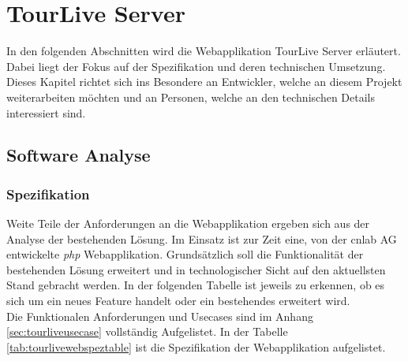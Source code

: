 \chapter{TourLive Server}
\label{sec:tourliveserver}
In den folgenden Abschnitten wird die Webapplikation TourLive Server erläutert. Dabei liegt der Fokus auf der Spezifikation und deren technischen Umsetzung. Dieses Kapitel richtet sich ins Besondere an Entwickler, welche an diesem Projekt weiterarbeiten möchten und an Personen, welche an den technischen Details interessiert sind.

\section{Software Analyse}
\subsection{Spezifikation}
Weite Teile der Anforderungen an die Webapplikation ergeben sich aus der Analyse der bestehenden Lösung. Im Einsatz ist zur Zeit eine, von der cnlab AG entwickelte \textit{\gls{php}} Webapplikation. Grundsätzlich soll die Funktionalität der bestehenden Lösung erweitert und in technologischer Sicht auf den aktuellsten Stand gebracht werden. In der folgenden Tabelle ist jeweils zu erkennen, ob es sich um ein neues Feature handelt oder ein bestehendes erweitert wird.
\\
Die Funktionalen Anforderungen und Usecases sind im Anhang \ref{sec:tourliveusecase} vollständig Aufgelistet. In der Tabelle \ref{tab:tourlivewebspeztable} ist die Spezifikation der Webapplikation aufgelistet.


